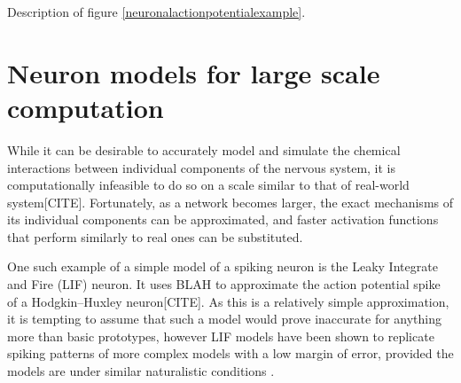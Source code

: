 Description of figure \ref{neuronalactionpotentialexample}.

\section{Neuron models for large scale computation}

While it can be desirable to accurately model and simulate the chemical
interactions between individual components of the nervous system, it is
computationally infeasible to do so on a scale similar to that of real-world
system[CITE]. Fortunately, as a network becomes larger, the exact mechanisms of
its individual components can be approximated, and faster activation functions
that perform similarly to real ones can be substituted. 

One such example of a simple model of a spiking neuron is the Leaky Integrate
and Fire (LIF) neuron. It uses BLAH to approximate the action potential spike of
a Hodgkin–Huxley neuron[CITE]. As this is a relatively simple approximation, it
is tempting to assume that such a model would prove inaccurate for anything more
than basic prototypes, however LIF models have been shown to replicate spiking
patterns of more complex models with a low margin of error, provided the models
are under similar naturalistic conditions \autocite{teeter_generalized_2018}.
